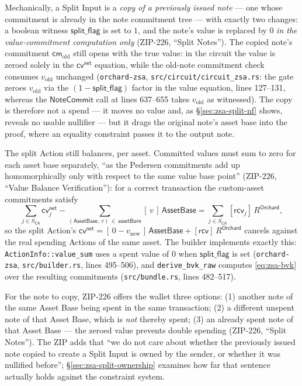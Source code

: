 \documentclass[11pt,a4paper]{article}
\theoremstyle{definition}
\newcommand{\cmsym}{\mathsf{cm}}
\newcommand{\cvsym}{\mathsf{cv}}
\newcommand{\NoteCommit}{\ensuremath{\mathsf{NoteCommit}}}
\newcommand{\rcv}{\ensuremath{\mathsf{rcv}}}
\begin{document}
Mechanically, a Split Input is a \emph{copy of a previously issued note} ---
one whose commitment is already in the note commitment tree --- with
exactly two changes: a boolean witness $\mathsf{split\_flag}$ is set to
$1$, and the note's value is replaced by $0$ \emph{in the value-commitment
computation only} (ZIP-226, ``Split Notes''). The copied note's commitment
$\cmsym_{\mathrm{old}}$ still opens with the true value: in the circuit the
value is zeroed solely in the $\cvsym^{\mathsf{net}}$ equation, while the
old-note commitment check consumes $v_{\mathrm{old}}$ unchanged
(\texttt{orchard-zsa}, \texttt{src/circuit/circuit\_zsa.rs}: the gate
zeroes $v_{\mathrm{old}}$ via the $(1-\mathsf{split\_flag})$ factor in the
value equation, lines 127--131, whereas the $\NoteCommit$ call at lines
637--655 takes $v_{\mathrm{old}}$ as witnessed). The copy is therefore not
a spend --- it moves no value and, as \S\ref{sec:zsa-split-nf} shows,
reveals no usable nullifier --- but it drags the original note's asset base
into the proof, where an equality constraint passes it to the output note.

The split Action still balances, per asset. Committed values must sum to
zero for each asset base separately, ``as the Pedersen commitments add up
homomorphically only with respect to the same value base point'' (ZIP-226,
``Value Balance Verification''): for a correct transaction the
custom-asset commitments satisfy
\[
\sum_{j \in S_{\mathsf{CA}}} \cvsym^{\mathsf{net}}_{j}
- \sum_{(\mathsf{AssetBase},\,v)\,\in\,\mathsf{assetBurn}}
[\,v\,]\,\mathsf{AssetBase}
= \sum_{j \in S_{\mathsf{CA}}} [\rcv_j]\,R^{\mathsf{Orchard}},
\]
so the split Action's $\cvsym^{\mathsf{net}} = [\,0 -
v_{\mathrm{new}}\,]\,\mathsf{AssetBase} + [\rcv]\,R^{\mathsf{Orchard}}$
cancels against the real spending Actions of the same asset. The builder
implements exactly this: \texttt{ActionInfo::value\_sum} uses a spent value
of $0$ when $\mathsf{split\_flag}$ is set (\texttt{orchard-zsa},
\texttt{src/builder.rs}, lines 495--506), and \texttt{derive\_bvk\_raw}
computes \eqref{eq:zsa-bvk} over the resulting commitments
(\texttt{src/bundle.rs}, lines 482--517).

For the note to copy, ZIP-226 offers the wallet three options: (1) another
note of the same Asset Base being spent in the same transaction; (2) a
different unspent note of that Asset Base, which is \emph{not} thereby
spent; (3) an already spent note of that Asset Base --- the zeroed value
prevents double spending (ZIP-226, ``Split Notes''). The ZIP adds that
``we do not care about whether the previously issued note copied to create
a Split Input is owned by the sender, or whether it was nullified
before''; \S\ref{sec:zsa-split-ownership} examines how far that sentence
actually holds against the constraint system.
\end{document}
